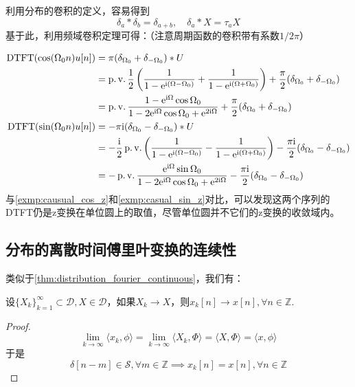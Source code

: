 利用分布的卷积的定义，容易得到
$$\delta_a*\delta_b=\delta_{a+b},\quad \delta_a*X=\tau_a X$$
基于此，利用频域卷积定理可得：（注意周期函数的卷积带有系数$1/2\pi$）

\begin{example}
    \begin{align*}
        \operatorname{DTFT}(\cos(\Omega_0 n)u[n]) & =\pi(\delta_{\Omega_0}+\delta_{-\Omega_0})*U                                                                                                                      \\
                                    & =\operatorname{p.v.}\frac{1}{2}\left(\frac{1}{1-\mathrm{e}^{\mathrm{i}(\Omega-\Omega_0)}}+\frac{1}{1-\mathrm{e}^{\mathrm{i}(\Omega+\Omega_0)}}\right)+\frac{\pi}{2}(\delta_{\Omega_0}+\delta_{-\Omega_0})       \\
                                    & =\operatorname{p.v.}\frac{1-\mathrm{e}^{\mathrm{i}\Omega}\cos\Omega_0}{1-2\mathrm{e}^{\mathrm{i}\Omega}\cos\Omega_0+\mathrm{e}^{2\mathrm{i}\Omega}}+\frac{\pi}{2}(\delta_{\Omega_0}+\delta_{-\Omega_0})                        \\
        \operatorname{DTFT}(\sin(\Omega_0 n)u[n]) & =-\pi\mathrm{i}(\delta_{\Omega_0}-\delta_{-\Omega_0})*U                                                                                                                  \\
                                    & =-\frac{\mathrm{i}}{2}\operatorname{p.v.}\left(\frac{1}{1-\mathrm{e}^{\mathrm{i}(\Omega-\Omega_0)}}-\frac{1}{1-\mathrm{e}^{\mathrm{i}(\Omega+\Omega_0)}}\right)-\frac{\pi\mathrm{i}}{2}(\delta_{\Omega_0}-\delta_{-\Omega_0}) \\
                                    & =-\operatorname{p.v.}\frac{\mathrm{e}^{\mathrm{i}\Omega}\sin\Omega_0}{1-2\mathrm{e}^{\mathrm{i}\Omega}\cos\Omega_0+\mathrm{e}^{2\mathrm{i}\Omega}}-\frac{\pi\mathrm{i}}{2}(\delta_{\Omega_0}-\delta_{-\Omega_0})
    \end{align*}
    与\cref{exmp:causual_cos_z}和\cref{exmp:casual_sin_z}对比，可以发现这两个序列的DTFT仍是z变换在单位圆上的取值，尽管单位圆并不它们的z变换的收敛域内。
\end{example}

\subsection{分布的离散时间傅里叶变换的连续性}\label{sub:DTFT_continuous}

类似于\cref{thm:distribution_fourier_continuous}，我们有：
\begin{theorem}\label{thm:DTFT_continuous_1}
    设$\{X_k\}_{k=1}^\infty\subset\mathcal{D},X\in\mathcal{D}$，如果$X_k\to X$，则$x_k[n]\to x[n],\forall n\in\mathbb{Z}$.
\end{theorem}
\begin{proof}
    $$\lim_{k\to\infty}\langle x_k,\phi\rangle=\lim_{k\to\infty}\langle X_k,\Phi\rangle=\langle X,\Phi\rangle=\langle x,\phi\rangle$$
    于是
    $$\delta[n-m]\in\mathcal{S},\forall m\in\mathbb{Z}\implies x_k[n]=x[n],\forall n\in\mathbb{Z}$$
\end{proof}

